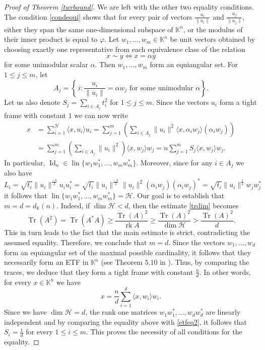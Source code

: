 \documentclass[12pt, reqno]{amsart}
\theoremstyle{definition}
\theoremstyle{remark}
\numberwithin{equation}{section}
\DeclareMathOperator{\lin}{lin}
\DeclareMathOperator{\tr}{Tr}
\DeclareMathOperator{\id}{Id}
\DeclareMathOperator{\rk}{rk}
\begin{document}
\begin{proof}[Proof of Theorem \ref{twrbound}]
We are left with the other two equality conditions. The condition \eqref{condequi} shows that for every pair of vectors $\frac{u_i}{\|u_i\|}$ and $\frac{u_j}{\|u_j\|}$, either they span the same one-dimensional subspace of $\mathbb{K}^n$, or the modulus of their inner product is equal to $\varphi$. Let $w_1,\ldots,w_m\in\mathbb{K}^n$ be unit vectors obtained by choosing exactly one representative from each equivalence class of the relation 
$$ x\sim y \iff x=\alpha y$$
for some unimodular scalar $\alpha$. Then $w_1,\ldots,w_m$ form an equiangular set. For $1 \leq j \leq m$, let
$$A_j=\left \{\,i:\frac{u_i}{\|u_i\|}=\alpha w_j \text{ for some unimodular }\alpha \right \}.$$
 Let us also denote $S_j = \sum_{i \in A_j} t_i^2$ for $1 \leq j \leq m$. Since the vectors $u_i$ form a tight frame with constant $1$ we can now write
\begin{equation}
\label{etfeq2}
\begin{split}
x &= \sum_{i=1}^{N} \langle x, u_i \rangle u_i = \sum_{j=1}^{m} \left ( \sum_{i \in A_j}  \|u_i\|^2 \langle x, \alpha_i w_j \rangle (\alpha_i w_j) \right ) \\ &=
\sum_{j=1}^{m} \left ( \sum_{i \in A_j}  \|u_i\|^2 \right ) \langle x, w_j \rangle w_j =n \sum_{j=1}^{m} S_j \langle x, w_j \rangle w_j.
\end{split}
\end{equation}
In particular, $\id_n \in \lin \{ w_1w_1^*, \ldots, w_mw_m^* \}$. Moreover, since for any $i \in A_j$ we also have 
$$L_i = \sqrt{t_i} \|u_i\|^{\frac{-3}{2}} u_iu_i^{*} = \sqrt{t_i} \|u_i\|^{\frac{-3}{2}} \|u_i\|^2 (\alpha_i w_j) (\alpha_i w_j)^{*} = \sqrt{t_i} \|u_i\|^{\frac{1}{2}} w_j w_j^{*} $$
it follows that $\lin \{ w_1w_1^*, \ldots, w_mw_m^* \}=\mathcal{H}$. Our goal is to establish that $m = d= d_{\mathbb{K}}(n)$. Indeed, if $\dim \mathcal{H} < d$, then the estimate \eqref{trdim} becomes
$$\tr(A^2)=\tr(A^*A) \geq \frac{\tr(A)^2}{\rk A} \geq \frac{\tr(A)^2}{\dim \mathcal{H}} > \frac{\tr(A)^2}{d}.$$
This in turn leads to the fact that the main estimate is strict, contradicting the assumed equality. Therefore, we conclude that $m = d$. Since the vectors $w_1, \ldots, w_d$ form an equiangular set of the maximal possible cardinality, it follows that they necessarily form an ETF in $\mathbb{K}^n$ (see Theorem $5.10$ in \cite{foucart}). Thus, by comparing the traces, we deduce that they form a tight frame with constant $\frac{n}{d}$. In other words, for every $x \in \mathbb{K}^n$ we have
$$x = \frac{n}{d} \sum_{i=1}^{d} \langle x, w_i \rangle w_i.$$
Since we have $\dim \mathcal{H}=d$, the rank one matrices $w_1w_1^*, \ldots, w_dw_d^*$ are linearly independent and by comparing the equality above with \eqref{etfeq2}, it follows that $S_i=\frac{1}{d}$ for every $1 \leq i \leq m$. This proves the necessity of all conditions for the equality.


\end{proof}
\end{document}
